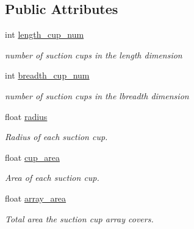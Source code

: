 \subsection*{Public Attributes}
\begin{DoxyCompactItemize}
\item 
\mbox{\label{classSuctionCupArray_a29d5e8498457d0fa5039444e66d1d178}} 
int \hyperlink{classSuctionCupArray_a29d5e8498457d0fa5039444e66d1d178}{length\+\_\+cup\+\_\+num}
\begin{DoxyCompactList}\small\item\em number of suction cups in the length dimension \end{DoxyCompactList}\item 
\mbox{\label{classSuctionCupArray_a98d7e70982afefdf3b1eaefc785dda49}} 
int \hyperlink{classSuctionCupArray_a98d7e70982afefdf3b1eaefc785dda49}{breadth\+\_\+cup\+\_\+num}
\begin{DoxyCompactList}\small\item\em number of suction cups in the lbreadth dimension \end{DoxyCompactList}\item 
\mbox{\label{classSuctionCupArray_a245c78c0bc387eef40fea1ecab401531}} 
float \hyperlink{classSuctionCupArray_a245c78c0bc387eef40fea1ecab401531}{radius}
\begin{DoxyCompactList}\small\item\em Radius of each suction cup. \end{DoxyCompactList}\item 
\mbox{\label{classSuctionCupArray_a7cd14259831ee3c35bc5dd60c6720afb}} 
float \hyperlink{classSuctionCupArray_a7cd14259831ee3c35bc5dd60c6720afb}{cup\+\_\+area}
\begin{DoxyCompactList}\small\item\em Area of each suction cup. \end{DoxyCompactList}\item 
\mbox{\label{classSuctionCupArray_a95010ae8b7309aea1428b02ff1897d42}} 
float \hyperlink{classSuctionCupArray_a95010ae8b7309aea1428b02ff1897d42}{array\+\_\+area}
\begin{DoxyCompactList}\small\item\em Total area the suction cup array covers. \end{DoxyCompactList}\item 

\end{DoxyCompactItemize}
